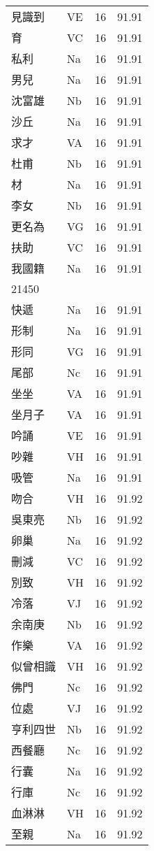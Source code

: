\documentclass[twocolumn]{book}
\begin{document}
\begin{supertabular}{llrr}
見識到 & VE & 16 &  91.91\\
育 & VC & 16 &  91.91\\
私利 & Na & 16 &  91.91\\
男兒 & Na & 16 &  91.91\\
沈富雄 & Nb & 16 &  91.91\\
沙丘 & Na & 16 &  91.91\\
求才 & VA & 16 &  91.91\\
杜甫 & Nb & 16 &  91.91\\
材 & Na & 16 &  91.91\\
李女 & Nb & 16 &  91.91\\
更名為 & VG & 16 &  91.91\\
扶助 & VC & 16 &  91.91\\
我國籍 & Na & 16 &  91.91\\
21450\\
快遞 & Na & 16 &  91.91\\
形制 & Na & 16 &  91.91\\
形同 & VG & 16 &  91.91\\
尾部 & Nc & 16 &  91.91\\
坐坐 & VA & 16 &  91.91\\
坐月子 & VA & 16 &  91.91\\
吟誦 & VE & 16 &  91.91\\
吵雜 & VH & 16 &  91.91\\
吸管 & Na & 16 &  91.91\\
吻合 & VH & 16 &  91.92\\
吳東亮 & Nb & 16 &  91.92\\
卵巢 & Na & 16 &  91.92\\
刪減 & VC & 16 &  91.92\\
別致 & VH & 16 &  91.92\\
冷落 & VJ & 16 &  91.92\\
余南庚 & Nb & 16 &  91.92\\
作樂 & VA & 16 &  91.92\\
似曾相識 & VH & 16 &  91.92\\
佛門 & Nc & 16 &  91.92\\
位處 & VJ & 16 &  91.92\\
亨利四世 & Nb & 16 &  91.92\\
西餐廳 & Nc & 16 &  91.92\\
行囊 & Na & 16 &  91.92\\
行庫 & Nc & 16 &  91.92\\
血淋淋 & VH & 16 &  91.92\\
至親 & Na & 16 &  91.92\\

\end{supertabular}
\end{document}

